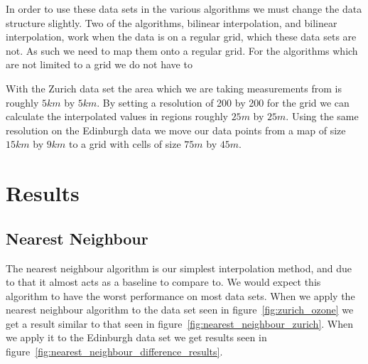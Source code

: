 			In order to use these data sets in the various algorithms we must change the data structure slightly. Two of the algorithms, bilinear interpolation, and bilinear interpolation, work when the data is on a regular grid, which these data sets are not. As such we need to map them onto a regular grid. For the algorithms which are not limited to a grid we do not have to

			With the Zurich data set the area which we are taking measurements from is roughly $5km$ by $5km$. By setting a resolution of 200 by 200 for the grid we can calculate the interpolated values in regions roughly $25m$ by $25m$. Using the same resolution on the Edinburgh data we move our data points from a map of size $15km$ by $9km$ to a grid with cells of size $75m$ by $45m$. 


    \section{Results}\label{prediction_evaluation_results}

        \subsection{Nearest Neighbour}\label{prediction_evaluation_results_nearest_neighbour}


	        The nearest neighbour algorithm is our simplest interpolation method, and due to that it almost acts as a baseline to compare to. We would expect this algorithm to have the worst performance on most data sets. When we apply the nearest neighbour algorithm to the data set seen in figure~\ref{fig:zurich_ozone} we get a result similar to that seen in figure~\ref{fig:nearest_neighbour_zurich}. When we apply it to the Edinburgh data set we get results seen in figure~\ref{fig:nearest_neighbour_difference_results}. 

